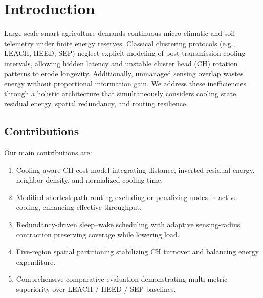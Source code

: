 \section{Introduction}
Large-scale smart agriculture demands continuous micro-climatic and soil telemetry under finite energy reserves. Classical clustering protocols (e.g., LEACH, HEED, SEP) neglect explicit modeling of post-transmission cooling intervals, allowing hidden latency and unstable cluster head (CH) rotation patterns to erode longevity. Additionally, unmanaged sensing overlap wastes energy without proportional information gain. We address these inefficiencies through a holistic architecture that simultaneously considers cooling state, residual energy, spatial redundancy, and routing resilience.

\subsection{Contributions}
Our main contributions are:
\begin{enumerate}[label=\textbf{C\arabic*}]
  \item Cooling-aware CH cost model integrating distance, inverted residual energy, neighbor density, and normalized cooling time.
  \item Modified shortest-path routing excluding or penalizing nodes in active cooling, enhancing effective throughput.
  \item Redundancy-driven sleep--wake scheduling with adaptive sensing-radius contraction preserving coverage while lowering load.
  \item Five-region spatial partitioning stabilizing CH turnover and balancing energy expenditure.
  \item Comprehensive comparative evaluation demonstrating multi-metric superiority over LEACH / HEED / SEP baselines.
\end{enumerate}
